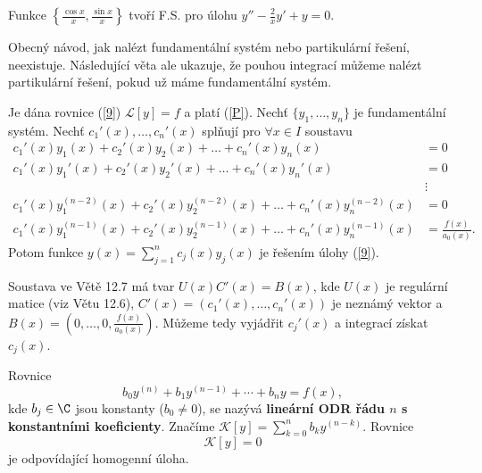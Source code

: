 \begin{priklad}
Funkce $\left\{\frac{\cos x}{x}, \frac{\sin x}{x}\right\}$ tvoří F.S. pro úlohu $y'' - \frac{2}{x} y' + y = 0$.
\end{priklad}

\begin{poznamka}
Obecný návod, jak nalézt fundamentální systém nebo partikulární řešení, neexistuje. Následující věta ale ukazuje, že pouhou integrací můžeme nalézt partikulární řešení, pokud už máme fundamentální systém.
\end{poznamka}

\begin{veta}
Je dána rovnice (\ref{9}) $\mathcal L [y] = f$ a platí (\ref{P}). Nechť $\{y_1, \ldots, y_n\}$ je fundamentální systém. Nechť $c_1'(x), \ldots, c_n'(x)$ splňují pro $\forall x \in I$ soustavu
\[
\begin{aligned}
c_1'(x) y_1(x) + c_2'(x) y_2(x) + \ldots + c_n'(x) y_n(x) &= 0 \\
c_1'(x) y_1'(x) + c_2'(x) y_2'(x) + \ldots + c_n'(x) y_n'(x) &= 0 \\
&\vdots \\
c_1'(x) y_1^{(n-2)}(x) + c_2'(x) y_2^{(n-2)}(x) + \ldots + c_n'(x) y_n^{(n-2)}(x) &= 0 \\
c_1'(x) y_1^{(n-1)}(x) + c_2'(x) y_2^{(n-1)}(x) + \ldots + c_n'(x) y_n^{(n-1)}(x) &= \frac{f(x)}{a_0(x)}.
\end{aligned}
\]
Potom funkce $y(x) = \sum_{j=1}^n c_j(x) y_j(x)$ je řešením úlohy (\ref{9}).
\end{veta}

\begin{poznamka}
Soustava ve Větě 12.7 má tvar $U(x)C'(x) = B(x)$, kde $U(x)$ je regulární matice (viz Větu 12.6), $C'(x) = (c_1'(x), \ldots, c_n'(x))$ je neznámý vektor a $B(x) = (0, \ldots, 0, \frac{f(x)}{a_0(x)})$. Můžeme tedy vyjádřit $c_j'(x)$ a integrací získat $c_j(x)$.
\end{poznamka}

\begin{definice}
Rovnice
\begin{equation}\label{11}
b_0 y^{(n)} + b_1 y^{(n-1)} + \cdots + b_n y = f(x),
\end{equation}
kde $b_j \in \C$ jsou konstanty ($b_0 \neq 0$), se nazývá \textbf{lineární ODR řádu $n$ s konstantními koeficienty}. Značíme $\mathcal K [y] = \sum_{k=0}^n b_k y^{(n-k)}$. Rovnice
\begin{equation}\label{12}
\mathcal K [y] = 0
\end{equation}
je odpovídající homogenní úloha.
\end{definice}

